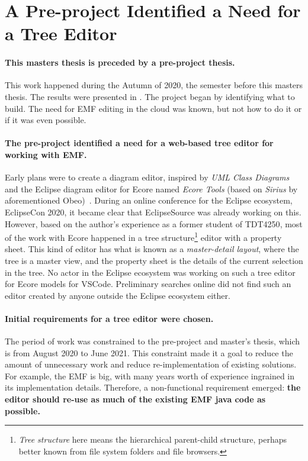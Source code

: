 \section{A Pre-project Identified a Need for a Tree Editor}

\paragraph{This masters thesis is preceded by a pre-project thesis.}
This work happened during the Autumn of 2020, the semester before this masters thesis.
The results were presented in \cite{rekstadModelingEnvironmentCloud2020}.
The project began by identifying what to build.
The need for \acrshort{EMF} editing in the \gls{cloud} was known, but not how to do it or if it was even possible.

\paragraph{The pre-project identified a need for a web-based tree editor for working with \acrshort{EMF}.}
Early plans were to create a diagram editor, inspired by \textit{\gls{UML} Class Diagrams} and the \gls{Eclipse} diagram editor for \gls{Ecore} named \textit{Ecore Tools} (based on \textit{Sirius} by aforementioned Obeo)~\cite{rekstadModelingEnvironmentCloud2020}.
During an online conference for the Eclipse ecosystem, EclipseCon 2020, it became clear that EclipseSource was already working on this.
However, based on the author's experience as a former student of \gls{TDT4250}, most of the work with \gls{Ecore} happened in a tree structure\footnote{\textit{Tree structure} here means the hierarchical parent-child structure, perhaps better known from file system folders and file browsers.} editor with a property sheet.
This kind of editor has what is known as a \textit{master-detail layout}, where the tree is a master view, and the property sheet is the details of the current selection in the tree.
No actor in the Eclipse ecosystem was working on such a tree editor for \gls{Ecore} models for \gls{VSCode}.
Preliminary searches online did not find such an editor created by anyone outside the Eclipse ecosystem either.


\paragraph{Initial requirements for a tree editor were chosen.}
The period of work was constrained to the pre-project and master's thesis, which is from August 2020 to June 2021.
This constraint made it a goal to reduce the amount of unnecessary work and reduce re-implementation of existing solutions.
For example, the \acrlong{EMF} is big, with many years worth of experience ingrained in its implementation details.
Therefore, a non-functional requirement emerged: \textbf{the editor should re-use as much of the existing \acrshort{EMF} java code as possible.}


